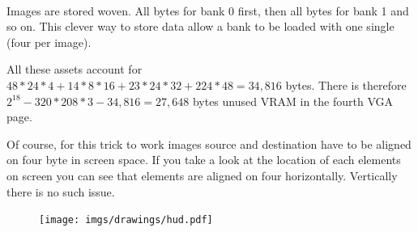     \begin{minipage}{.3\textwidth}
  \end{minipage}
\begin{minipage}{.3\textwidth}
  \end{minipage}
\begin{minipage}{.3\textwidth}
  \end{minipage}
\par

    \begin{minipage}{.3\textwidth}
  \end{minipage}
\begin{minipage}{.3\textwidth}
  \end{minipage}
\begin{minipage}{.3\textwidth}
  \end{minipage}
\par


\begin{minipage}{.1\textwidth}
  \end{minipage}
\begin{minipage}{.1\textwidth}
  \end{minipage}
\begin{minipage}{.1\textwidth}
  \end{minipage}
\begin{minipage}{.1\textwidth}
  \end{minipage}
  \begin{minipage}{.3\textwidth}
  \end{minipage}
\begin{minipage}{.3\textwidth}
  \end{minipage}\

 Images are stored woven. All bytes for bank 0 first, then all bytes for bank 1 and so on. This clever way to store data allow a bank to be loaded with one single  (four per image).\\
\par
All these assets account for $48*24*4+14*8*16+23*24*32+224*48=34,816$ bytes. There is therefore $2^18-320*208*3 - 34,816=27,648$ bytes unused VRAM in the fourth VGA page.\\
\par
Of course, for this trick to work images source and destination have to be aligned on four byte in screen space. If you take a look at the location of each elements on screen you can see that elements are aligned on four horizontally. Vertically there is no such issue.
\begin{figure}[H]
  \centering
 \texttt{[image: imgs/drawings/hud.pdf]}
\end{figure}

